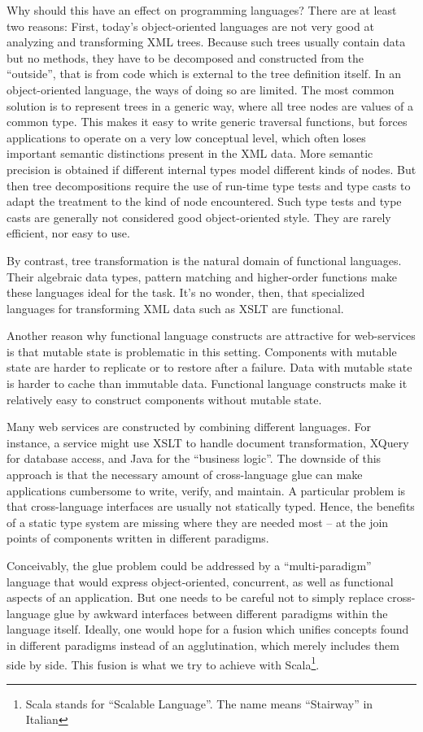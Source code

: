 Why should this have an effect on programming languages? There are at
least two reasons: First, today's object-oriented languages are not
very good at analyzing and transforming XML trees. Because such trees
usually contain data but no methods, they have to be decomposed and
constructed from the ``outside'', that is from code which is external
to the tree definition itself. In an object-oriented language, the
ways of doing so are limited. The most common solution \cite{w3c:dom} is
to represent trees in a generic way, where all tree nodes are values
of a common type.  This makes it easy to write generic traversal
functions, but forces applications to operate on a very low conceptual
level, which often loses important semantic distinctions present in
the XML data.  More semantic precision is obtained if different
internal types model different kinds of nodes.  But then tree
decompositions require the use of run-time type tests and type casts
to adapt the treatment to the kind of node encountered. Such type
tests and type casts are generally not considered good object-oriented
style. They are rarely efficient, nor easy to use.

By contrast, tree transformation is the natural domain of functional
languages. Their algebraic data types, pattern matching and
higher-order functions make these languages ideal for the task. It's
no wonder, then, that specialized languages for transforming XML data
such as XSLT are functional.

Another reason why functional language constructs are attractive for
web-services is that mutable state is problematic in this setting.
Components with mutable state are harder to replicate or to restore
after a failure. Data with mutable state is harder to cache than
immutable data. Functional language constructs make it relatively easy
to construct components without mutable state.

Many web services are constructed by combining different languages.
For instance, a service might use XSLT to handle document
transformation, XQuery for database access, and Java for the
``business logic''.  The downside of this approach is that the
necessary amount of cross-language glue can make applications
cumbersome to write, verify, and maintain. A particular problem is
that cross-language interfaces are usually not statically typed.
Hence, the benefits of a static type system are missing where they are
needed most -- at the join points of components written in different
paradigms.  

Conceivably, the glue problem could be addressed by a ``multi-paradigm''
language that would express object-oriented, concurrent, as well
as functional aspects of an application.  But one needs to be careful
not to simply replace cross-language glue by awkward interfaces
between different paradigms within the language itself.  Ideally, one
would hope for a fusion which unifies concepts found in different
paradigms instead of an agglutination, which merely includes them side
by side.  This fusion is what we try to achieve with Scala\footnote{Scala
stands for ``Scalable Language''. The name means ``Stairway'' in Italian}.

